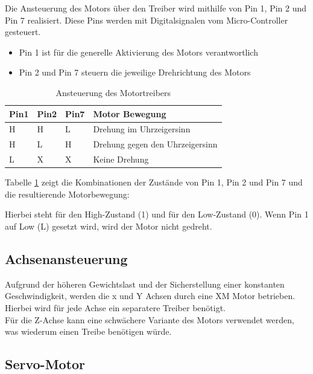 \documentclass[conference,compsoc,final,a4paper]{IEEEtran}
\begin{document}
\noindent Die Ansteuerung des Motors über den Treiber wird mithilfe von Pin 1, Pin 2 und Pin 7 realisiert. 
Diese Pins werden mit Digitalsignalen vom Micro-Controller gesteuert.
\begin{itemize}
  \item Pin 1 ist für die generelle Aktivierung des Motors verantwortlich
  \item Pin 2 und Pin 7 steuern die jeweilige Drehrichtung des Motors
\end{itemize}

\begin{table}[h]
  \caption{Ansteuerung des Motortreibers \autocite{l293DataSheet}}
  \label{AnsteuerungMotor}
  \centering
  \begin{tabular}{llll}
    \toprule
    \textbf{Pin1} & \textbf{Pin2} & \textbf{Pin7} & \textbf{Motor Bewegung}   \\ \hline
    \midrule
    H             & H             & L             & Drehung im Uhrzeigersinn        \\
    H             & L             & H             & Drehung gegen den Uhrzeigersinn \\
    L             & X             & X             & Keine Drehung                   \\ 
    \bottomrule
  \end{tabular}
  \end{table}
  
\noindent Tabelle \ref{AnsteuerungMotor} zeigt die Kombinationen der Zustände von Pin 1, Pin 2 und Pin 7 und die resultierende Motorbewegung:

\noindent Hierbei steht \grqq{} für den High-Zustand (1) und \grqq{} für den Low-Zustand (0). Wenn Pin 1 auf Low (L) gesetzt wird, wird der Motor nicht gedreht.

\subsection{Achsenansteuerung}

Aufgrund der höheren Gewichtslast und der Sicherstellung einer konstanten Geschwindigkeit, werden die x und Y Achsen durch eine XM Motor betrieben.
Hierbei wird für jede Achse ein separatere Treiber benötigt.
\\

\noindent Für die Z-Achse kann eine schwächere Variante des Motors verwendet werden, was wiederum einen Treibe benötigen würde.

\subsection{Servo-Motor}
\end{document}
